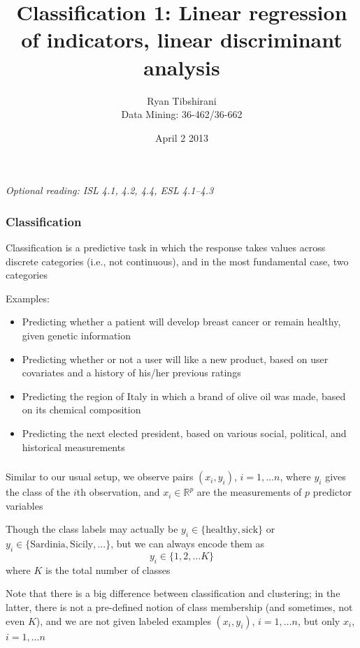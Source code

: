 \documentclass[mathserif]{beamer}
\def\R{\mathds{R}}
\def\red{\color[rgb]{0.8,0,0}}
\begin{document}
\title{Classification 1: Linear regression of indicators,
linear discriminant analysis}
\author{Ryan Tibshirani \\ Data Mining: 36-462/36-662}
\date{April 2 2013}

\begin{frame}
\maketitle
{\it Optional reading: ISL 4.1, 4.2, 4.4, ESL 4.1--4.3}
\end{frame}

\begin{frame}
\frametitle{Classification}
{\red Classification} is a predictive task in which the response takes
values across discrete categories (i.e., not continuous), and in the 
most fundamental case, two categories

\bigskip
Examples:
\begin{itemize}
\item Predicting whether a patient will develop breast cancer or remain
healthy, given genetic information
\item Predicting whether or not a user will like a new product, based on
user covariates and a history of his/her previous ratings
\item Predicting the region of Italy in which a brand of olive oil was 
made, based on its chemical composition
\item Predicting the next elected president, based on various social,
political, and historical measurements
\end{itemize}
\end{frame}

\begin{frame}
\frametitle{}
Similar to our usual setup, we observe pairs $(x_i,y_i)$, $i=1,\ldots n$, 
where $y_i$ gives the class of the $i$th observation, and $x_i \in \R^p$ are
the measurements of $p$ predictor variables

\bigskip
Though the class labels may actually be $y_i \in \{\mathrm{healthy}, 
\mathrm{sick}\}$ or $y_i \in \{\mathrm{Sardinia}, \mathrm{Sicily}, ... \}$, 
but we can always encode them as 
$$y_i \in \{1,2,\ldots K\}$$
where $K$ is the total number of classes

\bigskip
Note that there is a {\red big difference} between classification and
clustering; in the latter, there is not a pre-defined notion of class 
membership (and sometimes, not even $K$), and we are not given labeled 
examples $(x_i,y_i)$, $i=1,\ldots n$, but only $x_i$, $i=1,\ldots n$
\end{frame}
\end{document}
